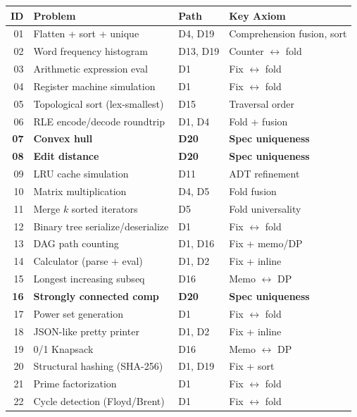 \documentclass[11pt,a4paper]{report}
\theoremstyle{definition}
\theoremstyle{plain}
\begin{document}
\begin{center}
\small
\begin{tabular}{r l l l}
  \textbf{ID} & \textbf{Problem} & \textbf{Path} &
  \textbf{Key Axiom} \\
  \hline
  01 & Flatten + sort + unique & D4, D19 & Comprehension fusion, sort \\
  02 & Word frequency histogram & D13, D19 & Counter $\leftrightarrow$ fold \\
  03 & Arithmetic expression eval & D1 & Fix $\leftrightarrow$ fold \\
  04 & Register machine simulation & D1 & Fix $\leftrightarrow$ fold \\
  05 & Topological sort (lex-smallest) & D15 & Traversal order \\
  06 & RLE encode/decode roundtrip & D1, D4 & Fold + fusion \\
  \textbf{07} & \textbf{Convex hull} & \textbf{D20} &
    \textbf{Spec uniqueness} \\
  \textbf{08} & \textbf{Edit distance} & \textbf{D20} &
    \textbf{Spec uniqueness} \\
  09 & LRU cache simulation & D11 & ADT refinement \\
  10 & Matrix multiplication & D4, D5 & Fold fusion \\
  11 & Merge $k$ sorted iterators & D5 & Fold universality \\
  12 & Binary tree serialize/deserialize & D1 & Fix $\leftrightarrow$ fold \\
  13 & DAG path counting & D1, D16 & Fix + memo/DP \\
  14 & Calculator (parse + eval) & D1, D2 & Fix + inline \\
  15 & Longest increasing subseq & D16 & Memo $\leftrightarrow$ DP \\
  \textbf{16} & \textbf{Strongly connected comp} & \textbf{D20} &
    \textbf{Spec uniqueness} \\
  17 & Power set generation & D1 & Fix $\leftrightarrow$ fold \\
  18 & JSON-like pretty printer & D1, D2 & Fix + inline \\
  19 & 0/1 Knapsack & D16 & Memo $\leftrightarrow$ DP \\
  20 & Structural hashing (SHA-256) & D1, D19 & Fix + sort \\
  21 & Prime factorization & D1 & Fix $\leftrightarrow$ fold \\
  22 & Cycle detection (Floyd/Brent) & D1 & Fix $\leftrightarrow$ fold \\

\end{tabular}
\end{center}
\end{document}

